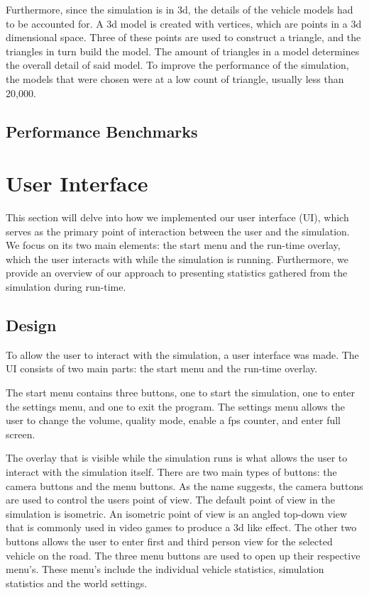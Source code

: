         Furthermore, since the simulation is in 3d, the details of the vehicle models had to be accounted for. A 3d model is created with vertices, which are points in a 3d dimensional space. Three of these points are used to construct a triangle, and the triangles in turn build the model. The amount of triangles in a model determines the overall detail of said model. To improve the performance of the simulation, the models that were chosen were at a low count of triangle, usually less than 20,000. 

    \subsection{Performance Benchmarks}

\section{User Interface}
This section will delve into how we implemented our user interface (UI), which serves as the primary point of interaction between the user and the simulation. We focus on its two main elements: the start menu and the run-time overlay, which the user interacts with while the simulation is running. Furthermore, we provide an overview of our approach to presenting statistics gathered from the simulation during run-time.
    
    \subsection{Design}
        To allow the user to interact with the simulation, a user interface was made. The UI consists of two main parts: the start menu and the run-time overlay. 
    
        The start menu contains three buttons, one to start the simulation, one to enter the settings menu, and one to exit the program. The settings menu allows the user to change the volume, quality mode, enable a fps counter, and enter full screen. 
    
        The overlay that is visible while the simulation runs is what allows the user to interact with the simulation itself. There are two main types of buttons: the camera buttons and the menu buttons. As the name suggests, the camera buttons are used to control the users point of view. The default point of view in the simulation is isometric. An isometric point of view is an angled top-down view that is commonly used in video games to produce a 3d like effect. The other two buttons allows the user to enter first and third person view for the selected vehicle on the road. The three menu buttons are used to open up their respective menu's. These menu's include the individual vehicle statistics, simulation statistics and the world settings.
        
